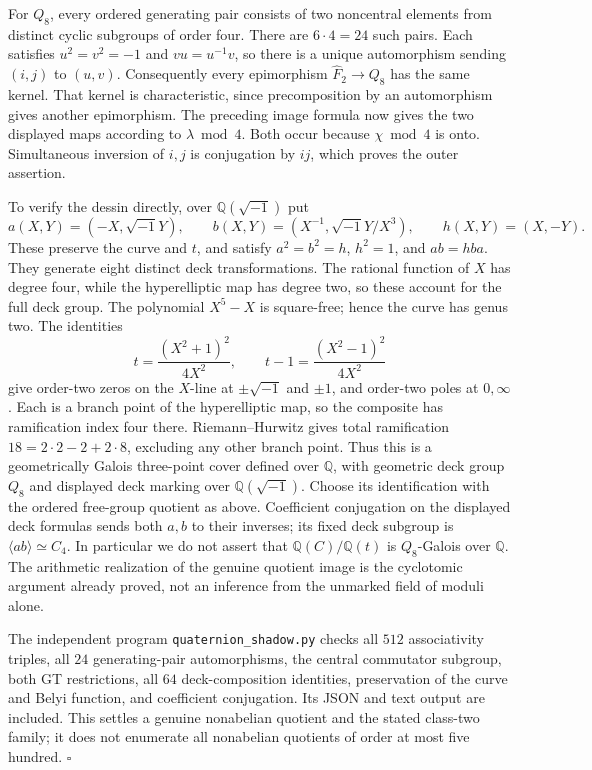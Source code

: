 \documentclass[10pt,a4paper]{article}
\begin{document}
For \(Q_8\), every ordered generating pair consists of two noncentral elements from distinct cyclic subgroups of order four. There are \(6\cdot4=24\) such pairs. Each satisfies \(u^2=v^2=-1\) and \(vu=u^{-1}v\), so there is a unique automorphism sending \((i,j)\) to \((u,v)\). Consequently every epimorphism \(\widehat F_2\to Q_8\) has the same kernel. That kernel is characteristic, since precomposition by an automorphism gives another epimorphism. The preceding image formula now gives the two displayed maps according to \(\lambda\bmod4\). Both occur because \(\chi\bmod4\) is onto. Simultaneous inversion of \(i,j\) is conjugation by \(ij\), which proves the outer assertion.

To verify the dessin directly, over \(\mathbb Q(\sqrt{-1})\) put \[
a(X,Y)=(-X,\sqrt{-1}Y),\qquad
b(X,Y)=(X^{-1},\sqrt{-1}Y/X^3),\qquad h(X,Y)=(X,-Y).
\] These preserve the curve and \(t\), and satisfy \(a^2=b^2=h\), \(h^2=1\), and \(ab=hba\). They generate eight distinct deck transformations. The rational function of \(X\) has degree four, while the hyperelliptic map has degree two, so these account for the full deck group. The polynomial \(X^5-X\) is square-free; hence the curve has genus two. The identities \[
t=\frac{(X^2+1)^2}{4X^2},\qquad
t-1=\frac{(X^2-1)^2}{4X^2}
\] give order-two zeros on the \(X\)-line at \(\pm\sqrt{-1}\) and \(\pm1\), and order-two poles at \(0,\infty\). Each is a branch point of the hyperelliptic map, so the composite has ramification index four there. Riemann--Hurwitz gives total ramification \(18=2\cdot2-2+2\cdot8\), excluding any other branch point. Thus this is a geometrically Galois three-point cover defined over \(\mathbb Q\), with geometric deck group \(Q_8\) and displayed deck marking over \(\mathbb Q(\sqrt{-1})\). Choose its identification with the ordered free-group quotient as above. Coefficient conjugation on the displayed deck formulas sends both \(a,b\) to their inverses; its fixed deck subgroup is \(\langle ab\rangle\simeq C_4\). In particular we do not assert that \(\mathbb Q(C)/\mathbb Q(t)\) is \(Q_8\)-Galois over \(\mathbb Q\). The arithmetic realization of the genuine quotient image is the cyclotomic argument already proved, not an inference from the unmarked field of moduli alone.

The independent program \texttt{quaternion\_shadow.py} checks all \(512\) associativity triples, all \(24\) generating-pair automorphisms, the central commutator subgroup, both GT restrictions, all \(64\) deck-composition identities, preservation of the curve and Belyi function, and coefficient conjugation. Its JSON and text output are included. This settles a genuine nonabelian quotient and the stated class-two family; it does not enumerate all nonabelian quotients of order at most five hundred. \(\square\)
\end{document}
